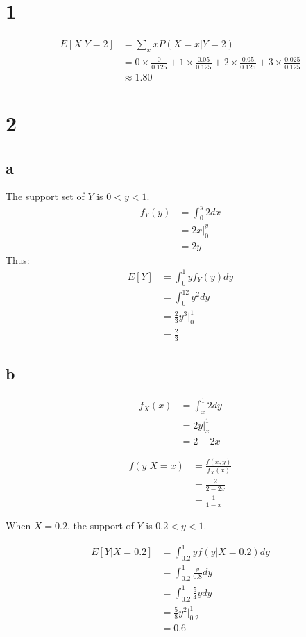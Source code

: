 \documentclass[10pt]{article}
\begin{document}
\section*{1}

\begin{align*}
    E[X|Y=2] &= \sum_x xP(X=x|Y=2)\\
    &= 0 \times \frac{0}{0.125} + 1 \times \frac{0.05}{0.125} + 2 \times \frac{0.05}{0.125} +3 \times \frac{0.025}{0.125}\\
    &\approx 1.80
\end{align*}

\section*{2}
\subsection*{a}

The support set of $Y$ is $0<y<1.$
\begin{align*}
    f_Y(y) &= \int_0^y 2dx\\
    &= 2x\Bigr |_0^y\\
    &= 2y
\end{align*}
Thus:
\begin{align*}
    E[Y] &= \int_0^1 yf_Y(y)dy\\
    &= \int_0^12y^2dy\\
    &= \frac{2}{3}y^3\Bigr |_0^1\\
    &= \frac{2}{3}
\end{align*}

\subsection*{b}
\begin{align*}
    f_X(x) &= \int_x^1 2dy\\
    &= 2y\Bigr |_x^1\\
    &= 2 -2x
\end{align*}

\begin{align*}
    f(y|X=x) &= \frac{f(x,y)}{f_X(x)}\\
    &= \frac{2}{2-2x}\\
    &= \frac{1}{1-x}
\end{align*}

When $X=0.2$, the support of $Y$ is $0.2<y<1.$

\begin{align*}
    E[Y|X=0.2] &= \int_{0.2}^1 yf(y|X=0.2)dy\\
    &= \int_{0.2}^1 \frac{y}{0.8}dy\\
    &= \int_{0.2}^1 \frac{5}{4}ydy\\
    &= \frac{5}{8}y^2\Bigr |_{0.2}^1\\
    &= 0.6
\end{align*}
\end{document}
